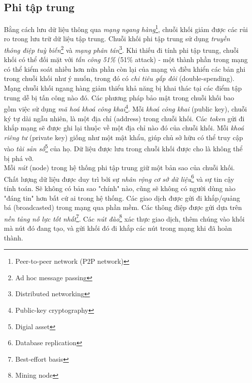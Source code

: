 \subsection{Phi tập trung}

Bằng cách lưu dữ liệu thông qua \textit{mạng ngang hàng}\footnote{Peer-to-peer network (P2P network)}, chuỗi khối giảm được các rủi ro trong lưu trữ dữ liệu tập trung. Chuỗi khối phi tập trung sử dụng \textit{truyền thông điệp tuỳ biến}\footnote{Ad hoc message passing} và \textit{mạng phân tán}\footnote{Distributed networking}. Khi thiếu đi tính phi tập trung, chuỗi khối có thể đối mặt với \textit{tấn công 51\%} (51\% attack) - một thành phần trong mạng có thể kiểm soát nhiều hơn nửa phần còn lại của mạng và điều khiển các bản ghi trong chuỗi khối như ý muốn, trong đó có \textit{chi tiêu gấp đôi} (double-spending).\\

Mạng chuỗi khối ngang hàng giảm thiểu khả năng bị khai thác tại các điểm tập trung dễ bị tấn công nào đó. Các phương pháp bảo mật trong chuỗi khối bao gồm việc sử dụng \textit{mã hoá khoá công khai}\footnote{Public-key cryptography}. Mỗi \textit{khoá công khai} (public key), chuỗi ký tự dài ngẫu nhiên, là một địa chỉ (address) trong chuỗi khối. Các \textit{token} gửi đi khắp mạng sẽ được ghi lại thuộc về một địa chỉ nào đó của chuỗi khối. Mỗi \textit{khoá riêng tư} (private key) giống như một mật khẩu, giúp chủ sở hữu có thể truy cập vào \textit{tài sản số}\footnote{Digial asset} của họ. Dữ liệu được lưu trong chuỗi khối được cho là không thể bị phá vỡ.\\

Mỗi \textit{nút} (node) trong hệ thống phi tập trung giữ một bản sao của chuỗi khối. Chất lượng dữ liệu được duy trì bởi sự \textit{nhân rộng cơ sở dữ liệu}\footnote{Database replication} và sự tin cậy tính toán. Sẽ không có bản sao "chính" nào, cũng sẽ không có người dùng nào "đáng tin" hơn bất cứ ai trong hệ thống. Các giao dịch được gửi đi khắp/quảng bá (broadcasted) trong mạng qua phần mềm. Các thông điệp được gửi dựa trên \textit{nền tảng nỗ lực tốt nhất}\footnote{Best-effort basis}. Các \textit{nút đào}\footnote{Mining node} xác thực giao dịch, thêm chúng vào khối mà nút đó đang tạo, và gửi khối đó đi khắp các nút trong mạng khi đã hoàn thành.
